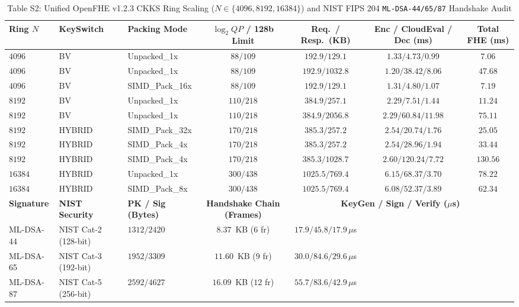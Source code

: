 \documentclass[10pt,journal,compsoc]{IEEEtran}
\begin{document}
\begin{table}[!t]
\centering
\caption{Table S2: Unified OpenFHE v1.2.3 CKKS Ring Scaling ($N \in \{4096, 8192, 16384\}$) and NIST FIPS 204 \texttt{ML-DSA-44/65/87} Handshake Audit}
\setlength{\tabcolsep}{3.8pt}
\renewcommand{\arraystretch}{1.04}
\begin{adjustbox}{max width=\textwidth}
\begin{tabular}{@{}lllcccc@{}}
\toprule
\textbf{Ring $N$} & \textbf{KeySwitch} & \textbf{Packing Mode} & $\log_2 QP$ / \textbf{128b Limit} & \textbf{Req.\ / Resp.\ (KB)} & \textbf{Enc / CloudEval / Dec (ms)} & \textbf{Total FHE (ms)} \\
\midrule
$4096$ & BV & Unpacked\_1x & $88/109$ & $192.9 / 129.1$ & $1.33 / 4.73 / 0.99$ & $7.06$ \\
$4096$ & BV & Unpacked\_1x & $88/109$ & $192.9 / 1032.8$ & $1.20 / 38.42 / 8.06$ & $47.68$ \\
$4096$ & BV & SIMD\_Pack\_16x & $88/109$ & $192.9 / 129.1$ & $1.31 / 4.80 / 1.07$ & $7.19$ \\
$8192$ & BV & Unpacked\_1x & $110/218$ & $384.9 / 257.1$ & $2.29 / 7.51 / 1.44$ & $11.24$ \\
$8192$ & BV & Unpacked\_1x & $110/218$ & $384.9 / 2056.8$ & $2.29 / 60.84 / 11.98$ & $75.11$ \\
$8192$ & HYBRID & SIMD\_Pack\_32x & $170/218$ & $385.3 / 257.2$ & $2.54 / 20.74 / 1.76$ & $25.05$ \\
$8192$ & HYBRID & SIMD\_Pack\_4x & $170/218$ & $385.3 / 257.2$ & $2.54 / 28.96 / 1.94$ & $33.44$ \\
$8192$ & HYBRID & SIMD\_Pack\_4x & $170/218$ & $385.3 / 1028.7$ & $2.60 / 120.24 / 7.72$ & $130.56$ \\
$16384$ & HYBRID & Unpacked\_1x & $300/438$ & $1025.5 / 769.4$ & $6.15 / 68.37 / 3.70$ & $78.22$ \\
$16384$ & HYBRID & SIMD\_Pack\_8x & $300/438$ & $1025.5 / 769.4$ & $6.08 / 52.37 / 3.89$ & $62.34$ \\
\midrule
\textbf{Signature} & \textbf{NIST Security} & \textbf{PK / Sig (Bytes)} & \textbf{Handshake Chain (Frames)} & \multicolumn{3}{c}{\textbf{KeyGen / Sign / Verify ($\mu$s)}} \\
\midrule
ML-DSA-44 & NIST Cat-2 (128-bit) & $1312 / 2420$ & $8.37$~KB ($6$ fr) & $17.9 / 45.8 / 17.9\,\mu$s \\
ML-DSA-65 & NIST Cat-3 (192-bit) & $1952 / 3309$ & $11.60$~KB ($9$ fr) & $30.0 / 84.6 / 29.6\,\mu$s \\
ML-DSA-87 & NIST Cat-5 (256-bit) & $2592 / 4627$ & $16.09$~KB ($12$ fr) & $55.7 / 83.6 / 42.9\,\mu$s \\
\bottomrule
\end{tabular}
\end{adjustbox}
\end{table}
\end{document}
